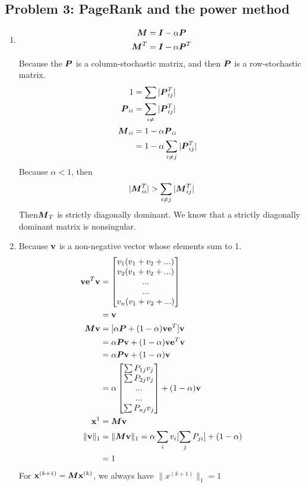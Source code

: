 \documentclass{article}
\begin{document}
\subsection*{{Problem 3: PageRank and the power method}}
\label{}
\begin{enumerate} 
\item 
\begin{align*}
\mM &=\mI-\alpha\mP \\
\mM^T &=\mI-\alpha\mP^T \\
\end{align*} 
Because the $\mP$ is a column-stochastic matrix, and then $\mP$ is a row-stochastic matrix.  
\begin{align*}
1 &= \sum |\mP^T_{ij}| &   \\
\mP_{ii}  & = \sum_{i\neq} |\mP^T_{ij}| \\
\mM_{ii} & =  1-\alpha\mP_{ii}  \\
& = 1- \alpha\sum_{i\neq j} |\mP^T_{ij}| \\
\end{align*}
Because $\alpha<1$, then 
\begin{align*} 
|\mM^T_{ii}|>\sum_{i\neq j} |\mM^T_{ij}|
\end{align*}
Then$\mM_T$ is strictly diagonally dominant. We know that a strictly diagonally dominant matrix is nonsingular. 

\item 
Because $\vv$ is a non-negative vector whose elements sum to 1. \\
\begin{align*} 
\vv\ve^T\vv &= \bmat{v_1(v_1+v_2+...) \\ v_2(v_1+v_2+...) \\ ... 
\\ ... \\v_n(v_1+v_2+...)} \\
& = \vv \\
\mM\vv &= [\alpha\mP+(1-\alpha)\vv\ve^T]\vv  \\
&= \alpha\mP\vv + (1-\alpha)\vv\ve^T\vv \\
& =  \alpha\mP\vv + (1-\alpha)\vv \\
& = \alpha\bmat{\sum P_{1j} v_j\\ \sum P_{2j}v_j \\ ... \\ ... \\ \sum P_{nj} v_j} + (1-\alpha)\vv \\
\vx^1 &=\mM\vv  \\
\|\vv\|_1 &= \|\mM\vv\|_1 = \alpha\sum_{i}v_i[\sum_{j}P_{ji}] + (	1-\alpha) \\
& = 1
\end{align*}
For $ \vx^{(k+1)} = \mM\vx^{(k)} $, we always have $\|x^{(k+1)}\|_1 = 1$ \\



\end{enumerate}
\end{document}
